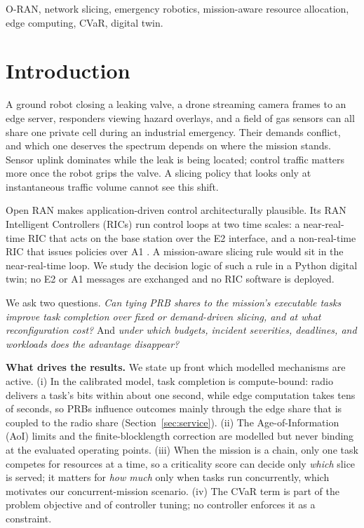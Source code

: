 \documentclass[conference]{IEEEtran}
\begin{document}
\begin{IEEEkeywords}
O-RAN, network slicing, emergency robotics, mission-aware resource allocation, edge computing, CVaR, digital twin.
\end{IEEEkeywords}

\section{Introduction}
A ground robot closing a leaking valve, a drone streaming camera frames to an edge server, responders viewing hazard overlays, and a field of gas sensors can all share one private cell during an industrial emergency. Their demands conflict, and which one deserves the spectrum depends on where the mission stands. Sensor uplink dominates while the leak is being located; control traffic matters more once the robot grips the valve. A slicing policy that looks only at instantaneous traffic volume cannot see this shift.

Open RAN makes application-driven control architecturally plausible. Its RAN Intelligent Controllers (RICs) run control loops at two time scales: a near-real-time RIC that acts on the base station over the E2 interface, and a non-real-time RIC that issues policies over A1 \cite{oranarch,oranwg3,polese}. A mission-aware slicing rule would sit in the near-real-time loop. We study the decision logic of such a rule in a Python digital twin; no E2 or A1 messages are exchanged and no RIC software is deployed.

We ask two questions. \emph{Can tying PRB shares to the mission's executable tasks improve task completion over fixed or demand-driven slicing, and at what reconfiguration cost?} And \emph{under which budgets, incident severities, deadlines, and workloads does the advantage disappear?}

\textbf{What drives the results.} We state up front which modelled mechanisms are active. (i) In the calibrated model, task completion is compute-bound: radio delivers a task's bits within about one second, while edge computation takes tens of seconds, so PRBs influence outcomes mainly through the edge share that is coupled to the radio share (Section~\ref{sec:service}). (ii) The Age-of-Information (AoI) limits and the finite-blocklength correction are modelled but never binding at the evaluated operating points. (iii) When the mission is a chain, only one task competes for resources at a time, so a criticality score can decide only \emph{which} slice is served; it matters for \emph{how much} only when tasks run concurrently, which motivates our concurrent-mission scenario. (iv) The CVaR term is part of the problem objective and of controller tuning; no controller enforces it as a constraint.
\end{document}
